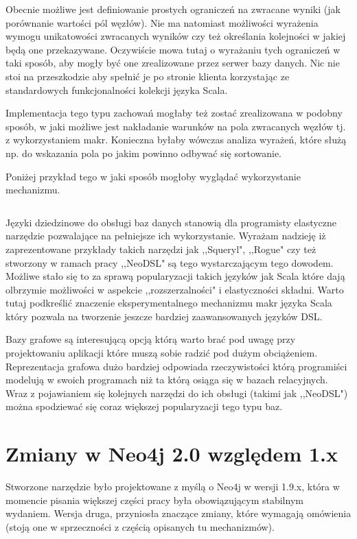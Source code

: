 \documentclass[brudnopis]{xmgr}
\begin{document}
Obecnie możliwe jest definiowanie prostych ograniczeń na zwracane wyniki (jak porównanie wartości pól węzłów). Nie ma natomiast możliwości wyrażenia wymogu unikatowości zwracanych wyników czy też określania kolejności w jakiej będą one przekazywane. Oczywiście mowa tutaj o wyrażaniu tych ograniczeń w taki sposób, aby mogły być one zrealizowane przez serwer bazy danych. Nic nie stoi na przeszkodzie aby spełnić je po stronie klienta korzystając ze standardowych funkcjonalności kolekcji języka Scala.

Implementacja tego typu zachowań mogłaby też zostać zrealizowana w podobny sposób, w jaki możliwe jest nakładanie warunków na pola zwracanych węzłów tj. z wykorzystaniem makr. Konieczna byłaby wówczas analiza wyrażeń, które służą np. do wskazania pola po jakim powinno odbywać się sortowanie. 

\medskip\noindent Poniżej przykład tego w jaki sposób mogłoby wyglądać wykorzystanie mechanizmu.

\inputminted{scala}{listings/scala/missing-query-features.scala}

\summary

Języki dziedzinowe do obsługi baz danych stanowią dla programisty elastyczne narzędzie pozwalające na pełniejsze ich wykorzystanie. Wyrażam nadzieję iż zaprezentowane przykłady takich narzędzi jak ,,Squeryl", ,,Rogue" czy też stworzony w ramach pracy ,,NeoDSL" są tego wystarczającym tego dowodem. Możliwe stało się to za sprawą popularyzacji takich języków jak Scala które dają olbrzymie możliwości w aspekcie ,,rozszerzalności" i elastyczności składni. Warto tutaj podkreślić znaczenie eksperymentalnego mechanizmu makr języka Scala który pozwala na tworzenie jeszcze bardziej zaawansowanych języków DSL. 

Bazy grafowe są interesującą opcją którą warto brać pod uwagę przy projektowaniu aplikacji które muszą sobie radzić pod dużym obciążeniem. Reprezentacja grafowa dużo bardziej odpowiada rzeczywistości którą programiści modelują w swoich programach niż ta którą osiąga się w bazach relacyjnych. Wraz z pojawianiem się kolejnych narzędzi do ich obsługi (takimi jak ,,NeoDSL") można spodziewać się coraz większej popularyzacji tego typu baz.

\appendix
\chapter{Zmiany w Neo4j 2.0 względem 1.x}

Stworzone narzędzie było projektowane z myślą o Neo4j w wersji 1.9.x, która w momencie pisania większej części pracy była obowiązującym stabilnym wydaniem. Wersja druga, przyniosła znaczące zmiany, które wymagają omówienia (stoją one w sprzeczności z częścią opisanych tu mechanizmów).
\end{document}
